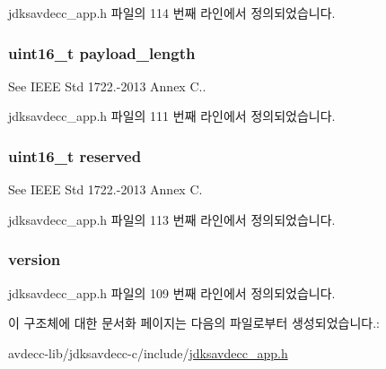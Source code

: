 jdksavdecc\+\_\+app.\+h 파일의 114 번째 라인에서 정의되었습니다.

\subsubsection[{\texorpdfstring{payload\+\_\+length}{payload_length}}]{\setlength{\rightskip}{0pt plus 5cm}uint16\+\_\+t payload\+\_\+length}\hypertarget{structjdksavdecc__appdu_a35753b38429185bc9a6e6f711925d6f1}{}\label{structjdksavdecc__appdu_a35753b38429185bc9a6e6f711925d6f1}
See I\+E\+EE Std 1722.-\/2013 Annex C.. 

jdksavdecc\+\_\+app.\+h 파일의 111 번째 라인에서 정의되었습니다.

\subsubsection[{\texorpdfstring{reserved}{reserved}}]{\setlength{\rightskip}{0pt plus 5cm}uint16\+\_\+t reserved}\hypertarget{structjdksavdecc__appdu_a5a6ed8c04a3db86066924b1a1bf4dad3}{}\label{structjdksavdecc__appdu_a5a6ed8c04a3db86066924b1a1bf4dad3}
See I\+E\+EE Std 1722.-\/2013 Annex C. 

jdksavdecc\+\_\+app.\+h 파일의 113 번째 라인에서 정의되었습니다.

\subsubsection[{\texorpdfstring{version}{version}}]{ version}\hypertarget{structjdksavdecc__appdu_ab22abc2906422da61885ac6c8e6a1a59}{}\label{structjdksavdecc__appdu_ab22abc2906422da61885ac6c8e6a1a59}


jdksavdecc\+\_\+app.\+h 파일의 109 번째 라인에서 정의되었습니다.



이 구조체에 대한 문서화 페이지는 다음의 파일로부터 생성되었습니다.\+:\begin{DoxyCompactItemize}
\item 
avdecc-\/lib/jdksavdecc-\/c/include/\hyperlink{jdksavdecc__app_8h}{jdksavdecc\+\_\+app.\+h}\end{DoxyCompactItemize}
